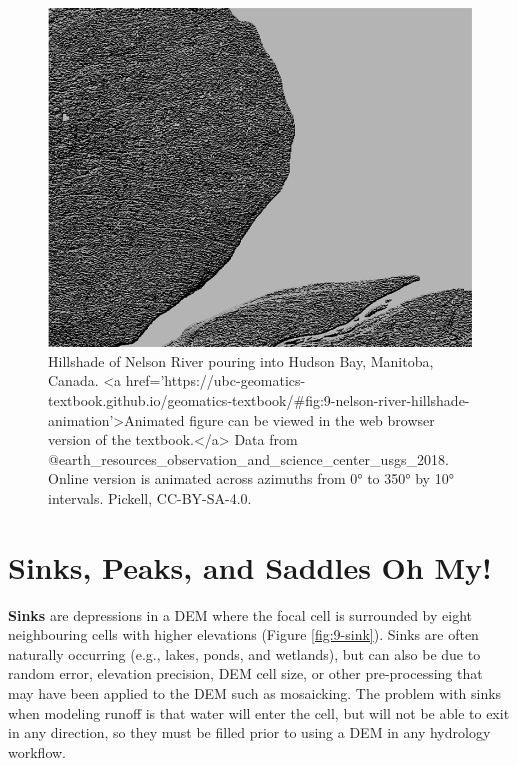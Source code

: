 \documentclass[
]{book}
\begin{document}
\begin{figure}
\includegraphics[width=0.75\linewidth]{images/09-nelson-river-hillshade-animation} \caption{Hillshade of Nelson River pouring into Hudson Bay, Manitoba, Canada. <a href='https://ubc-geomatics-textbook.github.io/geomatics-textbook/#fig:9-nelson-river-hillshade-animation'>Animated figure can be viewed in the web browser version of the textbook.</a> Data from @earth_resources_observation_and_science_center_usgs_2018. Online version is animated across azimuths from 0° to 350° by 10° intervals. Pickell, CC-BY-SA-4.0.}\label{fig:9-nelson-river-hillshade-animation}
\end{figure}

\section{Sinks, Peaks, and Saddles Oh My!}\label{sinks-peaks-and-saddles-oh-my}

\textbf{Sinks} are depressions in a DEM where the focal cell is surrounded by eight neighbouring cells with higher elevations (Figure \ref{fig:9-sink}). Sinks are often naturally occurring (e.g., lakes, ponds, and wetlands), but can also be due to random error, elevation precision, DEM cell size, or other pre-processing that may have been applied to the DEM such as mosaicking. The problem with sinks when modeling runoff is that water will enter the cell, but will not be able to exit in any direction, so they must be filled prior to using a DEM in any hydrology workflow.
\end{document}

